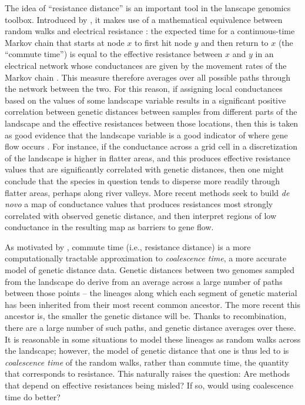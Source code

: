 \documentclass{article}
\begin{document}
The idea of ``resistance distance'' is an important tool in the lanscape genomics toolbox.
Introduced by \citet{mcrae2006isolation},
it makes use of a mathematical equivalence between random walks and electrical resistance
\citep{resistance}:
the expected time for a continuous-time Markov chain that starts at node $x$
to first hit node $y$ and then return to $x$ (the ``commute time'')
is equal to the effective resistance between $x$ and $y$ in an electrical network
whose conductances are given by the movement rates of the Markov chain \citep{levin}.
This measure therefore averages over all possible paths through the network between the two.
For this reason, 
if assigning local conductances based on the values of some landscape variable
results in a significant positive correlation between 
genetic distances between samples from different parts of the landscape
and the effective resistances between those locations,
then this is taken as good evidence that the landscape variable is a good indicator of
where gene flow occurs \citep{mcrae2007circuit,cushman2006complex,more_examples}.
For instance,
if the conductance across a grid cell in a discretization of the landscape
is higher in flatter areas,
and this produces effective resistance values 
that are significantly correlated with genetic distances,
then one might conclude that the species in question tends to disperse more readily through flatter areas,
perhaps along river valleys.
More recent methods \citep{petkova2016visualizing,hanks2013circuit} seek to build \emph{de novo} 
a map of conductance values that produces resistances 
most strongly correlated with observed genetic distance,
and then interpret regions of low conductance in the resulting map as barriers to gene flow.

As motivated by \citet{mcrae2006isolation},
commute time (i.e., resistance distance) is a more computationally tractable approximation
to \emph{coalescence time}, a more accurate model of genetic distance data.
Genetic distances between two genomes sampled from the landscape
do derive from an average across a large number of paths between those points --
the lineages along which each segment of genetic material has been inherited
from their most recent common ancestor.
The more recent this ancestor is,
the smaller the genetic distance will be.
Thanks to recombination, there are a large number of such paths, 
and genetic distance averages over these.
It is reasonable in some situations to model these lineages as random walks across the landscape;
however, the model of genetic distance that one is thus led to
is \emph{coalescence time} of the random walks, 
rather than commute time, the quantity that corresponds to resistance.
This naturally raises the question: 
Are methods that depend on effective resistances being misled?
If so, would using coalescence time do better?
\end{document}
